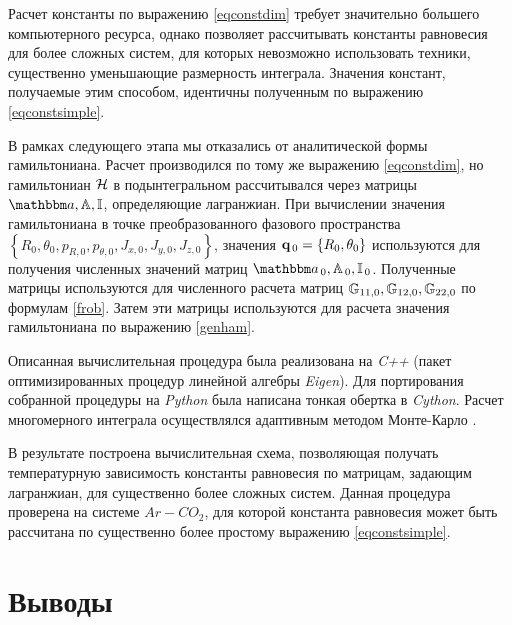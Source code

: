Расчет константы по выражению \eqref{eqconstdim} требует значительно большего компьютерного ресурса, однако позволяет рассчитывать константы равновесия для более сложных систем, для которых невозможно использовать техники, существенно уменьшающие размерность интеграла. Значения констант, получаемые этим способом, идентичны полученным по выражению \eqref{eqconstsimple}. \par 
В рамках следующего этапа мы отказались от аналитической формы гамильтониана. Расчет производился по тому же выражению \eqref{eqconstdim}, но гамильтониан $\mathcal{H}$ в подынтегральном рассчитывался через матрицы $\bba, \bbA, \bbI$, определяющие лагранжиан. При вычислении значения гамильтониана в точке преобразованного фазового пространства $\left\{ R_0, \theta_0, p_{R, 0}, p_{\theta, 0}, J_{x, 0}, J_{y, 0}, J_{z, 0} \right\}$, значения $\mathbf{q}_{\, 0} = \left\{ R_0, \theta_0 \right\}$ используются для получения численных значений матриц $\bba_{\, 0}, \bbA_{\, 0}, \bbI_{\, 0}$. Полученные матрицы используются для численного расчета матриц $\mathbb{G}_{11, 0}, \mathbb{G}_{12, 0}, \mathbb{G}_{22, 0}$ по формулам \eqref{frob}. Затем эти матрицы используются для расчета значения гамильтониана по выражению \eqref{genham}. \par
Описанная вычислительная процедура была реализована на \textit{C++} (пакет оптимизированных процедур линейной алгебры \textit{Eigen}). Для портирования собранной процедуры на \textit{Python} была написана тонкая обертка в \textit{Cython}. Расчет многомерного интеграла осуществлялся адаптивным методом Монте-Карло \cite{lepage1978, vegas}. \par 
В результате построена вычислительная схема, позволяющая получать температурную зависимость константы равновесия по матрицам, задающим лагранжиан, для существенно более сложных систем. Данная процедура проверена на системе $Ar-CO_2$, для которой константа равновесия может быть рассчитана по существенно более простому выражению \eqref{eqconstsimple}.   

\section{Выводы}

